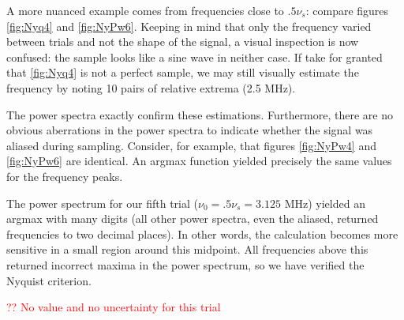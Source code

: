 \documentclass[a4paper]{article}
\begin{document}
A more nuanced example comes from frequencies close to $.5 \nu_s$: compare figures \ref{fig:Nyq4} and \ref{fig:NyPw6}. Keeping in mind that only the frequency varied between trials and not the shape of the signal, a visual inspection is now confused: the sample looks like a sine wave in neither case. If take for granted that \ref{fig:Nyq4} is not a perfect sample, we may still visually estimate the frequency by noting 10 pairs of relative extrema (2.5 MHz). 



The power spectra exactly confirm these estimations. Furthermore, there are no obvious aberrations in the power spectra to indicate whether the signal was aliased during sampling. Consider, for example, that figures \ref{fig:NyPw4} and \ref{fig:NyPw6} are identical. An argmax function yielded precisely the same values for the frequency peaks.

The power spectrum for our fifth trial ($\nu_0 = .5 \nu_s = 3.125$ MHz) yielded an argmax with many digits (all other power spectra, even the aliased, returned frequencies to two decimal places). In other words, the calculation becomes more sensitive in a small region around this midpoint. All frequencies above this returned incorrect maxima in the power spectrum, so we have verified the Nyquist criterion. 

\textcolor{red}{?? No value and no uncertainty for this trial}
\end{document}
